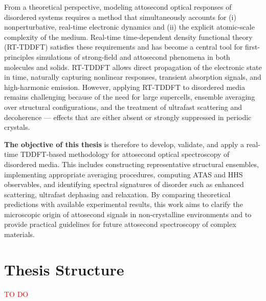 From a theoretical perspective, modeling attosecond optical responses of disordered systems requires a method that simultaneously accounts for (i) nonperturbative, real-time electronic dynamics and (ii) the explicit atomic-scale complexity of the medium. Real-time time-dependent density functional theory (RT-TDDFT) satisfies these requirements and has become a central tool for first-principles simulations of strong-field and attosecond phenomena in both molecules and solids. RT-TDDFT allows direct propagation of the electronic state in time, naturally capturing nonlinear responses, transient absorption signals, and high-harmonic emission. However, applying RT-TDDFT to disordered media remains challenging because of the need for large supercells, ensemble averaging over structural configurations, and the treatment of ultrafast scattering and decoherence — effects that are either absent or strongly suppressed in periodic crystals.


\textbf{The objective of this thesis} is therefore to develop, validate, and apply a real-time TDDFT-based methodology for attosecond optical spectroscopy of disordered media. This includes constructing representative structural ensembles, implementing appropriate averaging procedures, computing ATAS and HHS observables, and identifying spectral signatures of disorder such as enhanced scattering,
ultrafast dephasing and relaxation. By comparing theoretical predictions with available experimental results, this work aims to clarify the microscopic origin of attosecond signals in non-crystalline environments and to provide practical guidelines for future attosecond spectroscopy of complex materials.





\section{Thesis Structure}
\label{sec:outline}

\textcolor{red}{TO DO}

